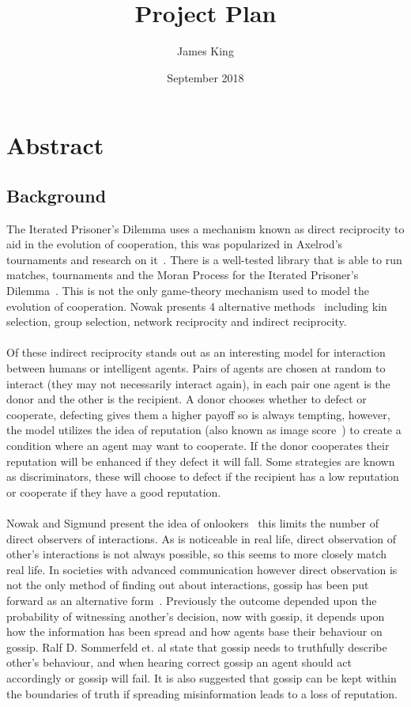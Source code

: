 \documentclass{article}
\title{Project Plan}
\author{James King}
\date{September 2018}
\begin{document}
\maketitle

\section*{Abstract}

\subsection*{Background}
The Iterated Prisoner's Dilemma uses a mechanism known as direct reciprocity to aid in the evolution of cooperation, this was popularized in Axelrod's tournaments and research on it~\cite{evolution_of_cooperation}. There is a well-tested library that is able to run matches, tournaments and the Moran Process for the Iterated Prisoner's Dilemma~\cite{axelrodproject}. This is not the only game-theory mechanism used to model the evolution of cooperation. Nowak presents 4 alternative methods~\cite{five_rules_coop} including kin selection, group selection, network reciprocity and indirect reciprocity.\\\\
Of these indirect reciprocity stands out as an interesting model for interaction between humans or intelligent agents. Pairs of agents are chosen at random to interact (they may not necessarily interact again), in each pair one agent is the donor and the other is the recipient. A donor chooses whether to defect or cooperate, defecting gives them a higher payoff so is always tempting, however, the model utilizes the idea of reputation (also known as image score~\cite{evol_indirect_image}) to create a condition where an agent may want to cooperate. If the donor cooperates their reputation will be enhanced if they defect it will fall. Some strategies are known as discriminators, these will choose to defect if the recipient has a low reputation or cooperate if they have a good reputation.\\\\
Nowak and Sigmund present the idea of onlookers~\cite{evol_indirect_image} this limits the number of direct observers of interactions. As is noticeable in real life, direct observation of other's interactions is not always possible, so this seems to more closely match real life. In societies with advanced communication however direct observation is not the only method of finding out about interactions, gossip has been put forward as an alternative form~\cite{gossip_alt}. Previously the outcome depended upon the probability of witnessing another's decision, now with gossip, it depends upon how the information has been spread and how agents base their behaviour on gossip. Ralf D. Sommerfeld et. al state that gossip needs to truthfully describe other's behaviour, and when hearing correct gossip an agent should act accordingly or gossip will fail. It is also suggested that gossip can be kept within the boundaries of truth if spreading misinformation leads to a loss of reputation.\\\\
\end{document}
